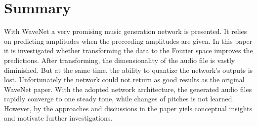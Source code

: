 \documentclass[10pt,conference,compsocconf]{IEEEtran}
\begin{document}
\section{Summary}
With WaveNet a very promising music generation network is presented. It relies on predicting amplitudes when the preceeding amplitudes are given. In this paper it is investigated whether transforming the data to the Fourier space improves the predictions. After transforming, the dimensionality of the audio file is vastly diminished. But at the same time, the ability to quantize the network's outputs is lost. Unfortunately the network could not return as good results as the original WaveNet paper. With the adopted network architecture, the generated audio files rapidly converge to one steady tone, while changes of pitches is not learned. However, by the approaches and discussions in the paper yiels conceptual insights and motivate further investigations.



\end{document}
